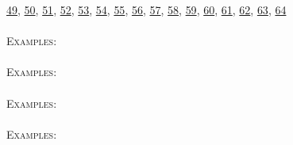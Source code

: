 \documentclass[a4paper,11pt]{report}
\begin{document}
{{\href{../www/SideLinks/About/aboutSpaceGroup.html} {49}{\nobreakspace}, \href{../www/SideLinks/About/aboutFunctorial.html} {50}{\nobreakspace}, \href{../www/SideLinks/About/aboutSuperperfect.html} {51}{\nobreakspace}, \href{../www/SideLinks/About/aboutGouter.html} {52}{\nobreakspace}, \href{../www/SideLinks/About/aboutSurvey.html} {53}{\nobreakspace}, \href{../www/SideLinks/About/aboutGraphsOfGroups.html} {54}{\nobreakspace}, \href{../www/SideLinks/About/aboutTDA.html} {55}{\nobreakspace}, \href{../www/SideLinks/About/aboutIntro.html} {56}{\nobreakspace}, \href{../www/SideLinks/About/aboutKnots.html} {57}{\nobreakspace}, \href{../www/SideLinks/About/aboutTensorSquare.html} {58}{\nobreakspace}, \href{../www/SideLinks/About/aboutKnotsQuandles.html} {59}{\nobreakspace}, \href{../www/SideLinks/About/aboutTopology.html} {60}{\nobreakspace}, \href{../www/SideLinks/About/aboutLieCovers.html} {61}{\nobreakspace}, \href{../www/SideLinks/About/aboutTorAndExt.html} {62}{\nobreakspace}, \href{../www/SideLinks/About/aboutLie.html} {63}{\nobreakspace}, \href{../www/SideLinks/About/aboutTwistedCoefficients.html} {64}{\nobreakspace} \\
 \\
 \texttt{}{\nobreakspace}{\nobreakspace}{\nobreakspace}{\nobreakspace}\textsc{Examples:} \\
 \\
 \texttt{}{\nobreakspace}{\nobreakspace}{\nobreakspace}{\nobreakspace}\textsc{Examples:} \\
 \\
 \texttt{}{\nobreakspace}{\nobreakspace}{\nobreakspace}{\nobreakspace}\textsc{Examples:} \\
 \\
 \texttt{}{\nobreakspace}{\nobreakspace}{\nobreakspace}{\nobreakspace}\textsc{Examples:} \\
 \\
}}
\end{document}
